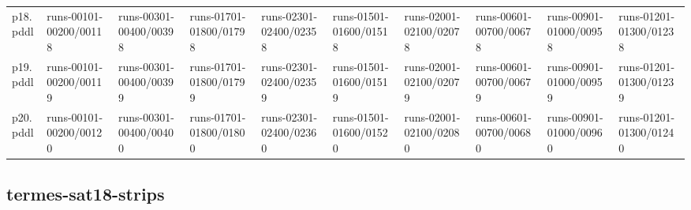 \documentclass{article}
\begin{document}
\begin{tabular}{@{}lrrrrrrrrr@{}}
p18.pddl & \multicolumn{1}{|l|}{runs-00101-00200/00118} & \multicolumn{1}{|l|}{runs-00301-00400/00398} & \multicolumn{1}{|l|}{runs-01701-01800/01798} & \multicolumn{1}{|l|}{runs-02301-02400/02358} & \multicolumn{1}{|l|}{runs-01501-01600/01518} & \multicolumn{1}{|l|}{runs-02001-02100/02078} & \multicolumn{1}{|l|}{runs-00601-00700/00678} & \multicolumn{1}{|l|}{runs-00901-01000/00958} & \multicolumn{1}{|l|}{runs-01201-01300/01238} \\
p19.pddl & \multicolumn{1}{|l|}{runs-00101-00200/00119} & \multicolumn{1}{|l|}{runs-00301-00400/00399} & \multicolumn{1}{|l|}{runs-01701-01800/01799} & \multicolumn{1}{|l|}{runs-02301-02400/02359} & \multicolumn{1}{|l|}{runs-01501-01600/01519} & \multicolumn{1}{|l|}{runs-02001-02100/02079} & \multicolumn{1}{|l|}{runs-00601-00700/00679} & \multicolumn{1}{|l|}{runs-00901-01000/00959} & \multicolumn{1}{|l|}{runs-01201-01300/01239} \\
p20.pddl & \multicolumn{1}{|l|}{runs-00101-00200/00120} & \multicolumn{1}{|l|}{runs-00301-00400/00400} & \multicolumn{1}{|l|}{runs-01701-01800/01800} & \multicolumn{1}{|l|}{runs-02301-02400/02360} & \multicolumn{1}{|l|}{runs-01501-01600/01520} & \multicolumn{1}{|l|}{runs-02001-02100/02080} & \multicolumn{1}{|l|}{runs-00601-00700/00680} & \multicolumn{1}{|l|}{runs-00901-01000/00960} & \multicolumn{1}{|l|}{runs-01201-01300/01240} \\
\end{tabular}

\hypertarget{run_dir-termes-sat18-strips}{}
\subsection*{termes-sat18-strips}
\end{document}
